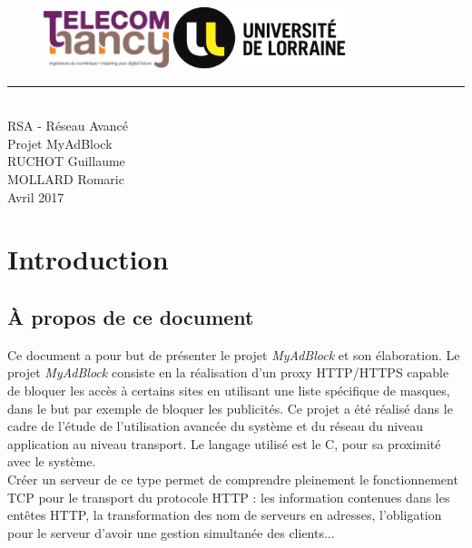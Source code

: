 \documentclass{scrreprt}
\date{}
\begin{document}
\thispagestyle{empty}
\begin{bfseries}
\begin{figure}
\includegraphics[height=1.8cm]{images/tn.png}
\hspace{1.2cm}
\includegraphics[height=1.8cm]{images/ul.png}
\vspace{3cm}
\end{figure}
\begin{flushright}
\rule{\paperwidth}{1pt}
\\
\vspace{2cm}
\Huge{RSA - Réseau Avancé}\\
\vspace{0.5cm}
\huge
Projet MyAdBlock\\
\vspace{1.9cm}
\Large
\vspace*{\fill}
RUCHOT Guillaume\\
MOLLARD Romaric\\
\vspace{1.9cm}
\small
Avril 2017\\
\end{flushright}
\end{bfseries}

\tableofcontents
\clearpage

\clearpage
\setcounter{page}{1}

\chapter{Introduction}

\section{À propos de ce document}
Ce document a pour but de présenter le projet \textit{MyAdBlock} et son élaboration. Le projet \textit{MyAdBlock} consiste en la réalisation d'un proxy HTTP/HTTPS capable de bloquer les accès à certains sites en utilisant une liste spécifique de masques, dans le but par exemple de bloquer les publicités.
Ce projet a été réalisé dans le cadre de l'étude de l'utilisation avancée du système et du réseau du niveau application au niveau transport. Le langage utilisé est le C, pour sa proximité avec le système.\\
Créer un serveur de ce type permet de comprendre pleinement le fonctionnement TCP pour le transport du protocole HTTP : les information contenues dans les entêtes HTTP, la transformation des nom de serveurs en adresses, l'obligation pour le serveur d'avoir une gestion simultanée des clients...\\
\end{document}
